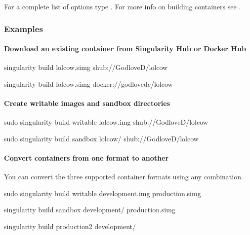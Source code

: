 \documentclass[letterpaper,10pt,english]{sphinxmanual}
\begin{document}
For a complete list of  options type . For more info on building
containers see .


\subsubsection{Examples}
\label{\detokenize{appendix:id26}}

\paragraph{Download an existing container from Singularity Hub or Docker Hub}
\label{\detokenize{appendix:download-an-existing-container-from-singularity-hub-or-docker-hub}}
%
\begin{sphinxVerbatim}[commandchars=\\\{\}]
\PYGZdl{} singularity build lolcow.simg shub://GodloveD/lolcow

\PYGZdl{} singularity build lolcow.simg docker://godlovedc/lolcow
\end{sphinxVerbatim}


\paragraph{Create \textendash{}writable images and \textendash{}sandbox directories}
\label{\detokenize{appendix:create-writable-images-and-sandbox-directories}}
%
\begin{sphinxVerbatim}[commandchars=\\\{\}]
\PYGZdl{} sudo singularity build \PYGZhy{}\PYGZhy{}writable lolcow.img shub://GodloveD/lolcow

\PYGZdl{} sudo singularity build \PYGZhy{}\PYGZhy{}sandbox lolcow/ shub://GodloveD/lolcow
\end{sphinxVerbatim}


\paragraph{Convert containers from one format to another}
\label{\detokenize{appendix:convert-containers-from-one-format-to-another}}
You can convert the three supported container formats using any
combination.

%
\begin{sphinxVerbatim}[commandchars=\\\{\}]
\PYGZdl{} sudo singularity build \PYGZhy{}\PYGZhy{}writable development.img production.simg

\PYGZdl{} singularity build \PYGZhy{}\PYGZhy{}sandbox development/ production.simg

\PYGZdl{} singularity build production2 development/
\end{sphinxVerbatim}
\end{document}
